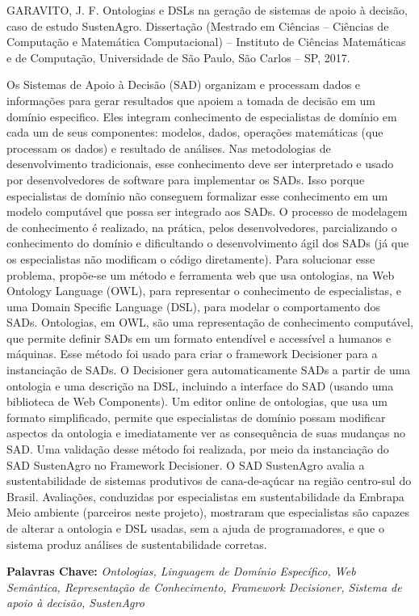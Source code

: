 GARAVITO, J. F. Ontologias e DSLs na geração de sistemas de apoio
à decisão, caso de estudo SustenAgro. Dissertação (Mestrado em Ciências
– Ciências de Computação e Matemática Computacional) – Instituto de
Ciências Matemáticas e de Computação, Universidade de São Paulo, São
Carlos – SP, 2017.

\vphantom{}

Os Sistemas de Apoio à Decisão (SAD)
organizam e processam dados e informações para gerar resultados que
apoiem a tomada de decisão em um domínio especifico. Eles integram
conhecimento de especialistas de domínio em cada um de seus componentes:
modelos, dados, operações matemáticas (que processam os dados) e resultado
de análises. Nas metodologias de desenvolvimento tradicionais, esse
conhecimento deve ser interpretado e usado por desenvolvedores de
software para implementar os SADs. Isso porque especialistas de domínio
não conseguem formalizar esse conhecimento em um modelo computável
que possa ser integrado aos SADs. O processo de modelagem de conhecimento
é realizado, na prática, pelos desenvolvedores, parcializando o conhecimento
do domínio e dificultando o desenvolvimento ágil dos SADs (já que
os especialistas não modificam o código diretamente). Para solucionar
esse problema, propõe-se um método e ferramenta web que usa ontologias,
na Web Ontology Language (OWL), para representar o conhecimento de
especialistas, e uma Domain Specific Language (DSL),
para modelar o comportamento dos SADs. Ontologias, em OWL, são uma
representação de conhecimento computável, que permite definir SADs
em um formato entendível e accessível a humanos e máquinas. Esse método
foi usado para criar o framework Decisioner para a instanciação de
SADs. O Decisioner gera automaticamente SADs a partir de uma ontologia
e uma descrição na  DSL, incluindo a interface do SAD (usando uma
biblioteca de Web Components). Um editor online de ontologias, que
usa um formato simplificado, permite que especialistas de domínio
possam modificar aspectos da ontologia e imediatamente ver as consequência
de suas mudanças no SAD. Uma validação desse método foi realizada,
por meio da instanciação do SAD SustenAgro no Framework Decisioner.
O SAD SustenAgro avalia a sustentabilidade de sistemas produtivos
de cana-de-açúcar na região centro-sul do Brasil. Avaliações, conduzidas
por especialistas em sustentabilidade da Embrapa Meio ambiente (parceiros
neste projeto), mostraram que especialistas são capazes de alterar
a ontologia e DSL usadas, sem a ajuda de programadores, e que o sistema
produz análises de sustentabilidade corretas. 

\vphantom{}

\textbf{Palavras Chave:} \emph{Ontologias, Linguagem de Domínio Específico,
Web Semântica, Representação de Conhecimento, Framework Decisioner,
Sistema de apoio à decisão, SustenAgro}
